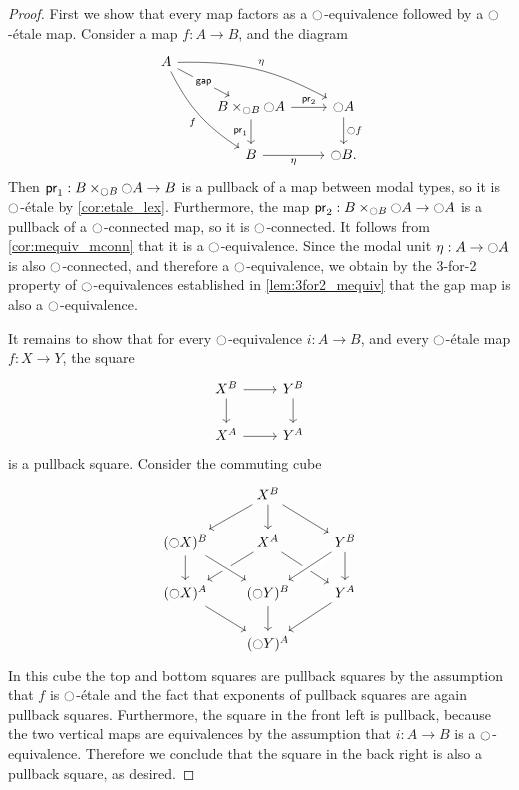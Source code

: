 \documentclass[9pt,twosided]{amsart}
\begin{document}
\begin{proof}
  First we show that every map factors as a ${\ocircle}$-equivalence followed by a ${\ocircle}$-\'etale map. Consider a map $f:A\to B$, and the diagram
\begin{equation*}
\begin{tikzcd}
A \arrow[ddr,bend right=15,swap,"f"] \arrow[drr,bend left=15,"\modalunit"] \arrow[dr,"\mathsf{gap}" description] \\
& B\times_{\modal B} \modal A \arrow[d,swap,"\proj 1"] \arrow[r,"\proj 2"] & \modal A \arrow[d,"\modal f"] \\
& B \arrow[r,swap,"\modalunit"] & \modal B.
\end{tikzcd}
\end{equation*}
Then $\mathsf{pr}_{1}:B\times_{{\ocircle} B} {\ocircle} A\to B$ is a pullback of a map between modal types, so it is ${\ocircle}$-\'etale by \cref{cor:etale_lex}. Furthermore, the map $\mathsf{pr}_{2}:B\times_{{\ocircle} B}{\ocircle} A\to {\ensuremath{\ocircle}} A$ is a pullback of a ${\ocircle}$-connected map, so it is ${\ocircle}$-connected. It follows from \cref{cor:mequiv_mconn} that it is a ${\ocircle}$-equivalence. Since the modal unit ${\eta_{}} :A\to{\ensuremath{\ocircle}} A$ is also ${\ocircle}$-connected, and therefore a ${\ocircle}$-equivalence, we obtain by the 3-for-2 property of ${\ocircle}$-equivalences established in \cref{lem:3for2_mequiv} that the gap map is also a ${\ocircle}$-equivalence.
  
It remains to show that for every ${\ocircle}$-equivalence $i:A\to B$, and every ${\ocircle}$-\'etale map $f:X\to Y$, the square
\begin{equation*}
\begin{tikzcd}
X^B \arrow[r] \arrow[d] & Y^B \arrow[d] \\
X^A \arrow[r] & Y^A
\end{tikzcd}
\end{equation*}
is a pullback square. Consider the commuting cube
\begin{equation*}
\begin{tikzcd}
&[-1ex] X^B \arrow[dl] \arrow[d] \arrow[dr] \\
(\modal X)^B \arrow[d] & X^A \arrow[dl] \arrow[dr] & Y^B \arrow[d] \arrow[dl,crossing over] \\
(\modal X)^A \arrow[dr] & (\modal Y)^B \arrow[from=ul,crossing over] \arrow[d] & Y^A \arrow[dl] \\
& (\modal Y)^A
\end{tikzcd}
\end{equation*}
In this cube the top and bottom squares are pullback squares by the assumption that $f$ is ${\ocircle}$-\'etale and the fact that exponents of pullback squares are again pullback squares. Furthermore, the square in the front left is pullback, because the two vertical maps are equivalences by the assumption that $i:A\to B$ is a ${\ocircle}$-equivalence. Therefore we conclude that the square in the back right is also a pullback square, as desired.
\end{proof}
\end{document}
